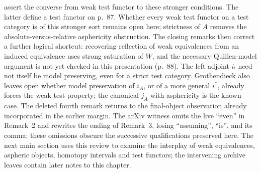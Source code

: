 \documentclass[10pt,oneside]{book}
\begin{document}
assert the converse from weak test functor to these stronger conditions. The latter define a test functor on p.~87. Whether every weak test functor on a test category is of this stronger sort remains open here; strictness of $A$ removes the absolute-versus-relative asphericity obstruction. The closing remarks then correct a further logical shortcut: recovering reflection of weak equivalences from an induced equivalence uses strong saturation of $W$, and the necessary Quillen-model argument is not yet checked in this presentation (p.~88). The left adjoint $i_!$ need not itself be model preserving, even for a strict test category. Grothendieck also leaves open whether model preservation of $i_A$, or of a more general $i^*$, already forces the weak test property; the canonical $j_A$ with asphericity is the known case. The deleted fourth remark returns to the final-object observation already incorporated in the earlier margin. The arXiv witness omits the live ``even'' in Remark~2 and rewrites the ending of Remark~3, losing ``assuming'', ``is'', and its comma; these omissions obscure the successive qualifications preserved here. The next main section uses this review to examine the interplay of weak equivalences, aspheric objects, homotopy intervals and test functors; the intervening archive leaves contain later notes to this chapter.
\end{document}
